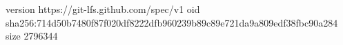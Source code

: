 version https://git-lfs.github.com/spec/v1
oid sha256:714d50b7480f87f020df8222dfb960239b89c89e721da9a809edf38fbc90a284
size 2796344
